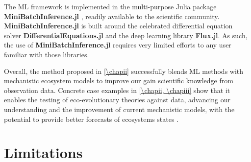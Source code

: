 The ML framework is implemented in the multi-purpose Julia package \textbf{MiniBatchInference.jl} \citep{MiniBatchInference}, readily available to the scientific community. \textbf{MiniBatchInference.jl} is built around the celebrated differential equation solver \textbf{DifferentialEquations.jl} and the deep learning library \textbf{Flux.jl}. As such, the use of \textbf{MiniBatchInference.jl} requires very limited efforts to any user familiar with those libraries.

Overall, the method proposed in \cref{\chapii} successfully blends ML methods with mechanistic ecosystem models to improve our gain scientific knowledge from observation data. Concrete case examples in \cref{\chapii, \chapiii} show that it enables the testing of eco-evolutionary theories against data, advancing our understanding and the improvement of current mechanistic models, with the potential to provide better forecasts of ecosystems states \citep{Urban2016}.

\section{Limitations}

